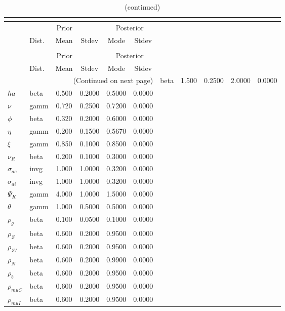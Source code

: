  
\begin{center}
\begin{longtable}{llcccc} 
\caption{Results from posterior maximization (parameters)}\\
 \label{Table:Posterior:1}\\
\toprule 
  & \multicolumn{3}{c}{Prior}  &  \multicolumn{2}{c}{Posterior} \\
  \cmidrule(r{.75em}){2-4} \cmidrule(r{.75em}){5-6}
  & Dist. & Mean  & Stdev & Mode & Stdev \\ 
\midrule \endfirsthead 
\caption{(continued)}\\
 \bottomrule 
  & \multicolumn{3}{c}{Prior}  &  \multicolumn{2}{c}{Posterior} \\
  \cmidrule(r{.75em}){2-4} \cmidrule(r{.75em}){5-6}
  & Dist. & Mean  & Stdev & Mode & Stdev \\ 
\midrule \endhead 
\bottomrule \multicolumn{6}{r}{(Continued on next page)}\endfoot 
\bottomrule\endlastfoot 
${\sigma}$ & beta &   1.500 & 0.2500 &   2.0000 &  0.0000 \\ 
${ha}$ & beta &   0.500 & 0.2000 &   0.5000 &  0.0000 \\ 
$\nu$ & gamm &   0.720 & 0.2500 &   0.7200 &  0.0000 \\ 
${\phi}$ & beta &   0.320 & 0.2000 &   0.6000 &  0.0000 \\ 
${\eta}$ & gamm &   0.200 & 0.1500 &   0.5670 &  0.0000 \\ 
$\xi$ & gamm &   0.850 & 0.1000 &   0.8500 &  0.0000 \\ 
${\nu_R}$ & beta &   0.200 & 0.1000 &   0.3000 &  0.0000 \\ 
${\sigma_{ac}}$ & invg &   1.000 & 1.0000 &   0.3200 &  0.0000 \\ 
${\sigma_{ai}}$ & invg &   1.000 & 1.0000 &   0.3200 &  0.0000 \\ 
${\Psi_{K}}$ & gamm &   4.000 & 1.0000 &   1.5000 &  0.0000 \\ 
${\theta}$ & gamm &   1.000 & 0.5000 &   0.5000 &  0.0000 \\ 
${\rho_g}$ & beta &   0.100 & 0.0500 &   0.1000 &  0.0000 \\ 
${\rho_Z}$ & beta &   0.600 & 0.2000 &   0.9500 &  0.0000 \\ 
${\rho_{ZI}}$ & beta &   0.600 & 0.2000 &   0.9500 &  0.0000 \\ 
${\rho_N}$ & beta &   0.600 & 0.2000 &   0.9900 &  0.0000 \\ 
${\rho_b}$ & beta &   0.600 & 0.2000 &   0.9500 &  0.0000 \\ 
${\rho_{muC}}$ & beta &   0.600 & 0.2000 &   0.9500 &  0.0000 \\ 
${\rho_{muI}}$ & beta &   0.600 & 0.2000 &   0.9500 &  0.0000 \\ 
\end{longtable}
 \end{center}
